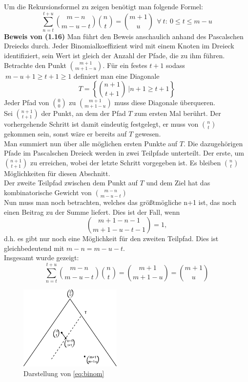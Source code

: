 \documentclass[a4paper, 11pt]{scrreprt}
\begin{document}
Um die Rekursionsformel zu zeigen benötigt man folgende Formel:
\begin{equation}
\label{eq:binom}
	\sum_{n= t}^{t+u} \binom{m-n}{m-u-t} \binom{n}{t} = \binom{m+1}{u}~~\forall\ t: \ 0\leq t \leq m-u
\end{equation}
\textbf{Beweis von (1.16)}  
Man führt den Beweis anschaulich anhand des Pascalschen Dreiecks durch. Jeder Binomialkoeffizient wird mit einem Knoten im Dreieck identifiziert, sein Wert ist gleich der Anzahl der Pfade, die zu ihm führen. \\
Betrachte den Punkt $ \binom{m+1}{m+1-u} $. Für ein festes $t+1$ sodass $~m-u+1\geq t+1 \geq 1$ definiert man  eine Diagonale \[T=\left\lbrace  \binom{n+1}{t+1}~\vert n+1 \geq t+1 \right\rbrace  \] Jeder Pfad von $ \binom{0}{0} $ zu $ \binom{m+1}{m+1-u} $ muss diese Diagonale überqueren. \\Sei $ \binom{n+1}{t+1} $ der Punkt, an dem der Pfad $ T $ zum ersten Mal berührt. Der vorhergehende Schritt ist damit eindeutig festgelegt, er muss von $ \binom{n}{t} $ gekommen sein, sonst wäre er bereits auf $ T $ gewesen.\\ 
Man summiert nun über alle möglichen ersten Punkte auf $ T $. Die dazugehörigen Pfade im Pascalschen Dreieck werden in zwei Teilpfade unterteilt. Der erste, um $ \binom{n+1}{t+1} $ zu erreichen, wobei der letzte Schritt vorgegeben ist. Es bleiben $ \binom{n}{t} $ Möglichkeiten für diesen Abschnitt.\\
Der zweite Teilpfad zwischen dem Punkt auf $ T $ und dem Ziel hat das kombinatorische Gewicht von $\binom{m-n}{m-u-t}$\\
Nun muss man noch betrachten, welches das größtmögliche n+1 ist, das noch einen Beitrag zu der Summe liefert. Dies ist der Fall, wenn \[ \binom{m+1-n-1}{m+1-u-t-1}=1,  \] d.h. es gibt nur noch eine Möglichkeit für den zweiten Teilpfad. Dies ist gleichbedeutend mit $ m-n=m-u-t $.\\Insgesamt wurde gezeigt:
\[ \sum_{n=t}^{t+u}\binom{m-n}{m-u-t} \binom{n}{t}= \binom{m+1}{m+1-u}=\binom{m+1}{u} \]

\begin{figure}[htpb]
	\centering
	\includegraphics[width=0.45\textwidth]{Parsevalsches-Dreieck.pdf}
	\caption{Darstellung von \ref{eq:binom}}
\end{figure}
\end{document}
